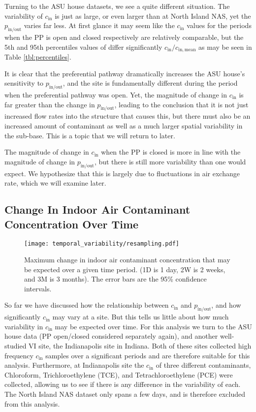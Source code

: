 \documentclass[journal=esthag,manuscript=article]{achemso}
\begin{document}
Turning to the ASU house datasets, we see a quite different situation.
The variability of $c_\mathrm{in}$ is just as large, or even larger than at North Island NAS, yet the $p_\mathrm{in/out}$ varies far less.
At first glance it may seem like the $c_\mathrm{in}$ values for the periods when the PP is open and closed respectively are relatively comparable, but the 5th and 95th percentiles values of differ significantly $c_\mathrm{in}/c_\mathrm{in,mean}$ as may be seen in Table \ref{tbl:percentiles}.

It is clear that the preferential pathway dramatically increases the ASU house's sensitivity to $p_\mathrm{in/out}$, and the site is fundamentally different during the period when the preferential pathway was open.
Yet, the magnitude of change in $c_\mathrm{in}$ is far greater than the change in $p_\mathrm{in/out}$, leading to the conclusion that it is not just increased flow rates into the structure that causes this, but there must also be an increased amount of contaminant as well as a much larger spatial variability in the sub-base.
This is a topic that we will return to later.

The magnitude of change in $c_\mathrm{in}$ when the PP is closed is more in line with the magnitude of change in $p_\mathrm{in/out}$, but there is still more variability than one would expect.
We hypothesize that this is largely due to fluctuations in air exchange rate, which we will examine later.

\subsection{Change In Indoor Air Contaminant Concentration Over Time} %

\begin{figure}[htb!]
  \centering
  \caption{Maximum change in indoor air contaminant concentration that may be expected over a given time period. (1D is 1 day, 2W is 2 weeks, and 3M is 3 months). The error bars are the 95\% confidence intervals.}
  \label{fig:resampling}
  \texttt{[image: temporal\_variability/resampling.pdf]}
\end{figure}

So far we have discussed how the relationship between $c_\mathrm{in}$ and $p_\mathrm{in/out}$, and how significantly $c_\mathrm{in}$ may vary at a site.
But this tells us little about how much variability in $c_\mathrm{in}$ may be expected over time.
For this analysis we turn to the ASU house data (PP open/closed considered separately again), and another well-studied VI site, the Indianapolis site in Indiana.
Both of these sites collected high frequency $c_\mathrm{in}$ samples over a significant periods and are therefore suitable for this analysis\cite{u.s._environmental_protection_agency_assessment_2015,holton_temporal_2013}.
Furthermore, at Indianapolis site the $c_\mathrm{in}$ of three different contaminants, Chloroform, Trichloroethylene (TCE), and Tetrachloroethylene (PCE) were collected, allowing us to see if there is any difference in the variability of each.
The North Island NAS dataset only spans a few days, and is therefore excluded from this analysis.
\end{document}
